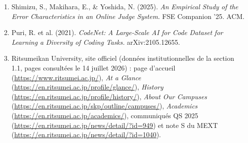 \documentclass[11pt, a4paper]{article}
\begin{document}
{\small
\begin{enumerate}
  \item Shimizu, S., Makihara, E., \& Yoshida, N. (2025).
        \textit{An Empirical Study of the Error Characteristics in an Online
        Judge System.} FSE Companion '25. ACM.
  \item Puri, R. et al. (2021).
        \textit{CodeNet: A Large-Scale AI for Code Dataset for Learning
        a Diversity of Coding Tasks.} arXiv:2105.12655.
  \item Ritsumeikan University, site officiel (données institutionnelles de
        la section 1.1, pages consultées le 14 juillet 2026) :
        page d'accueil (\url{https://www.ritsumei.ac.jp/}),
        \textit{At a Glance} (\url{https://en.ritsumei.ac.jp/profile/glance/}),
        \textit{History} (\url{https://en.ritsumei.ac.jp/profile/history/}),
        \textit{About Our Campuses} (\url{https://en.ritsumei.ac.jp/skp/outline/campuses/}),
        \textit{Academics} (\url{https://en.ritsumei.ac.jp/academics/}),
        communiqués QS 2025 (\url{https://en.ritsumei.ac.jp/news/detail/?id=949})
        et note \og S \fg{} du MEXT
        (\url{https://en.ritsumei.ac.jp/news/detail/?id=1040}).
\end{enumerate}
}
\end{document}
